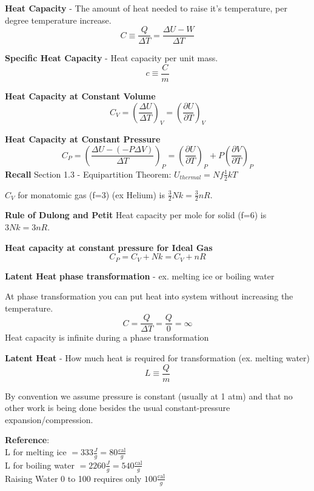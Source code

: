 \textbf{Heat Capacity} - The amount of heat needed to raise it's temperature, per degree temperature increase.
\[C \equiv \frac{Q}{\Delta T} = \frac{\Delta U - W}{\Delta T}\]

\textbf{Specific Heat Capacity} - Heat capacity per unit mass.
\[c \equiv \frac{C}{m}\]
\begin{shaded}
\textbf{Heat Capacity at Constant Volume}
\begin{equation}
C_V = \left(\frac{\Delta U}{\Delta T}\right)_V = \left(\frac{\partial U}{\partial T}\right)_V
\end{equation}
\end{shaded}

\textbf{Heat Capacity at Constant Pressure}
\begin{equation}
C_P = \left(\frac{\Delta U - (-P\Delta V)}{\Delta T}\right)_P = \left(\frac{\partial U}{\partial T}\right)_P + P\left(\frac{\partial V}{\partial T}\right)_P
\end{equation}
\textbf{Recall}
Section 1.3 - Equipartition Theorem: $U_{thermal} = Nf \frac{1}{2} kT$
\begin{note}
$C_V$ for monatomic gas (f=3) (ex Helium) is $\frac{3}{2}Nk=\frac{3}{2}nR$. 

\hspace{15mm} \textbf{Rule of Dulong and Petit} Heat capacity per mole for solid (f=6) is $3Nk=3nR$. 
\end{note}

\begin{shaded}
\textbf{Heat capacity at constant pressure for Ideal Gas}
\begin{equation}
    C_P = C_V + Nk = C_V + nR
\end{equation}
\end{shaded}

\textbf{Latent Heat}
\textbf{phase transformation} - ex. melting ice or boiling water

At phase transformation you can put heat into system without increasing the temperature.
\[C=\frac{Q}{\Delta T} = \frac{Q}{0} = \infty\]
Heat capacity is infinite during a phase transformation

\textbf{Latent Heat} - How much heat is required for transformation (ex. melting water)
\[ L \equiv \frac{Q}{m} \]
\begin{note}
By convention we assume pressure is constant (usually at 1 atm) and that no other work is being done besides the usual constant-pressure expansion/compression.
\end{note}
\textbf{Reference}:\\
L for melting ice $ = 333\frac{J}{g}  = 80\frac{\text{cal}}{g}$ \\
L for boiling water $ = 2260\frac{J}{g}  = 540\frac{\text{cal}}{g}$ \\
Raising Water 0 to 100 requires only $100\frac{\text{cal}}{g}$

